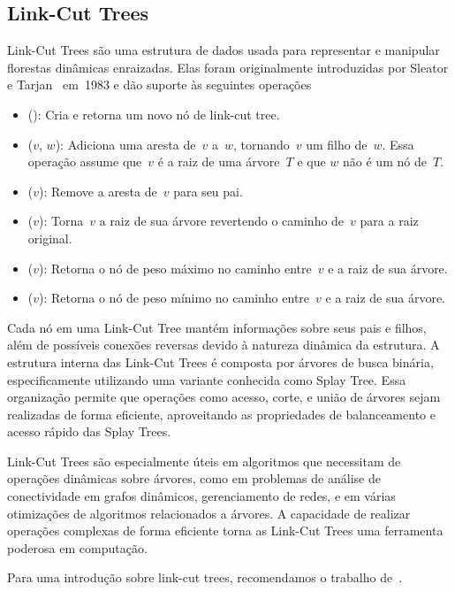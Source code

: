\subsection{Link-Cut Trees}
\label{sec:linkcuttree}
Link-Cut Trees são uma estrutura de dados usada para representar e manipular florestas dinâmicas enraizadas.
Elas foram originalmente introduzidas por Sleator e Tarjan~\cite{SleatroTarjanLinkCutTree1983,} em~1983 e dão suporte às seguintes operações
\begin{itemize}
\item \linkcutCreate(): Cria e retorna um novo nó de link-cut tree.
\item \linkcutAddEdge($v$, $w$): Adiciona uma aresta de~$v$ a~$w$, tornando~$v$ um filho de~$w$. Essa operação assume que~$v$ é a raiz de uma árvore~$T$ e que $w$ não é um nó de~$T$.
\item \linkcutDelEdge($v$): Remove a aresta de~$v$ para seu pai.
\item \linkcutEvert($v$): Torna~$v$ a raiz de sua árvore revertendo o caminho de~$v$ para a raiz original.
\item \linkcutMax($v$): Retorna o nó de peso máximo no caminho entre~$v$ e a raiz de sua árvore.
\item \linkcutMin($v$): Retorna o nó de peso mínimo no caminho entre~$v$ e a raiz de sua árvore.
\end{itemize}

Cada nó em uma Link-Cut Tree mantém informações sobre seus pais e filhos, além de possíveis conexões reversas devido à natureza dinâmica da estrutura. A estrutura interna das Link-Cut Trees é composta por árvores de busca binária, especificamente utilizando uma variante conhecida como Splay Tree. Essa organização permite que operações como acesso, corte, e união de árvores sejam realizadas de forma eficiente, aproveitando as propriedades de balanceamento e acesso rápido das Splay Trees.

Link-Cut Trees são especialmente úteis em algoritmos que necessitam de operações dinâmicas sobre árvores, como em problemas de análise de conectividade em grafos dinâmicos, gerenciamento de redes, e em várias otimizações de algoritmos relacionados a árvores. A capacidade de realizar operações complexas de forma eficiente torna as Link-Cut Trees uma ferramenta poderosa em computação.

Para uma introdução sobre link-cut trees, recomendamos o trabalho de~\cite{linkcuttree}.




